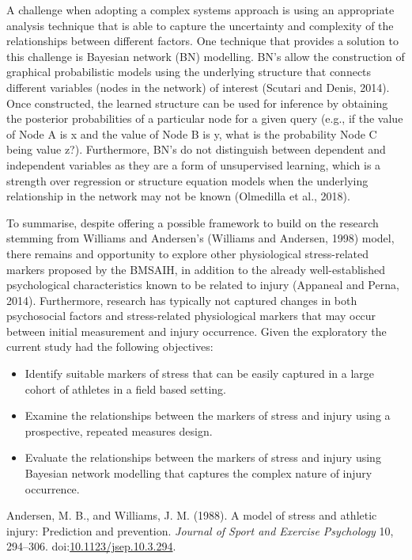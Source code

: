 \documentclass[utf8]{frontiersHLTH}
\providecommand{\tightlist}{%
  \setlength{\itemsep}{0pt}\setlength{\parskip}{0pt}}
\begin{document}
A challenge when adopting a complex systems approach is using an
appropriate analysis technique that is able to capture the uncertainty
and complexity of the relationships between different factors. One
technique that provides a solution to this challenge is Bayesian network
(BN) modelling. BN's allow the construction of graphical probabilistic
models using the underlying structure that connects different variables
(nodes in the network) of interest (Scutari and Denis, 2014). Once
constructed, the learned structure can be used for inference by
obtaining the posterior probabilities of a particular node for a given
query (e.g., if the value of Node A is x and the value of Node B is y,
what is the probability Node C being value z?). Furthermore, BN's do not
distinguish between dependent and independent variables as they are a
form of unsupervised learning, which is a strength over regression or
structure equation models when the underlying relationship in the
network may not be known (Olmedilla et al., 2018).

To summarise, despite offering a possible framework to build on the
research stemming from Williams and Andersen's (Williams and Andersen,
1998) model, there remains and opportunity to explore other
physiological stress-related markers proposed by the BMSAIH, in addition
to the already well-established psychological characteristics known to
be related to injury (Appaneal and Perna, 2014). Furthermore, research
has typically not captured changes in both psychosocial factors and
stress-related physiological markers that may occur between initial
measurement and injury occurrence. Given the exploratory the current
study had the following objectives:

\begin{itemize}
\tightlist
\item
  Identify suitable markers of stress that can be easily captured in a
  large cohort of athletes in a field based setting.
\item
  Examine the relationships between the markers of stress and injury
  using a prospective, repeated measures design.
\item
  Evaluate the relationships between the markers of stress and injury
  using Bayesian network modelling that captures the complex nature of
  injury occurrence.
\end{itemize}

\hypertarget{refs}{}
\leavevmode\hypertarget{ref-Andersen1988}{}%
Andersen, M. B., and Williams, J. M. (1988). A model of stress and
athletic injury: Prediction and prevention. \emph{Journal of Sport and
Exercise Psychology} 10, 294--306.
doi:\href{https://doi.org/10.1123/jsep.10.3.294}{10.1123/jsep.10.3.294}.
\end{document}
